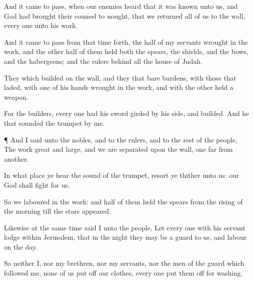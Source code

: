 {And it came to pass, when our
enemies
heard that it was
known unto us, and
God had
brought their
counsel to
nought, that we
returned all of us to the
wall, every
one unto his
work.


\par }{\PP {}And it came to pass from that
time forth,
{} the
half of my
servants
wrought in the
work, and the other
half of them
held both the
spears, the
shields, and the
bows, and the
habergeons; and the
rulers
{}
behind all the
house of
Judah.

They which
builded on the
wall, and they that
bare
burdens, with those that
laded,
{} with
one of his
hands
wrought in the
work, and with the
other
{}
held a
weapon.

For the
builders, every
one had his
sword
girded by his
side, and
{}
builded. And he that
sounded the
trumpet
{} by
me.


\par }{\PP {}¶ And I
said unto the
nobles, and to the
rulers, and to the
rest of the
people, The
work
{}
great and
large, and we are
separated upon the
wall,
one far
from
another.

In what
place
{} ye
hear the
sound of the
trumpet,
resort ye thither unto us: our
God shall
fight for us.

So we
laboured in the
work: and
half of them
held the
spears from the
rising of the
morning till the
stars
appeared.

Likewise at the same
time
said I unto the
people, Let every
one with his
servant
lodge
within
Jerusalem, that in the
night they may be a
guard to us, and
labour on the
day.

So neither I, nor my
brethren, nor my
servants, nor the
men of the
guard which
followed me, none of
us put
off our
clothes,
{} every
one put them
off for
washing.




\par }
